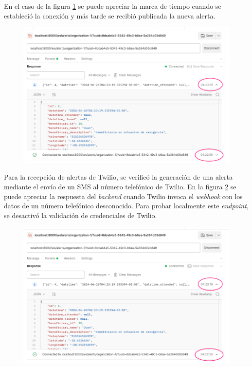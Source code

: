 En el caso de la figura \ref{fig:postman2} se puede apreciar la marca de tiempo cuando se estableció la conexión y más tarde se recibió publicada la nueva alerta.

\begin{figure}[H]
	\centering
  	\includegraphics[width=1\linewidth]{./Figures/postman2.png}
  	\label{fig:postman2}
\end{figure}

Para la recepción de alertas de Twilio, se verificó la generación de una alerta mediante el envío de un SMS al número telefónico de Twilio. En la figura \ref{fig:backend-twilio} se puede apreciar la respuesta del \textit{backend} cuando Twilio invoca el \textit{webhook} con los datos de un número telefónico desconocido. Para probar localmente este \textit{endpoint}, se desactivó la validación de credenciales de Twilio.

\begin{figure}[H]
	\centering
  	\includegraphics[width=1\linewidth]{./Figures/postman2.png}
  	\label{fig:backend-twilio}
\end{figure}

